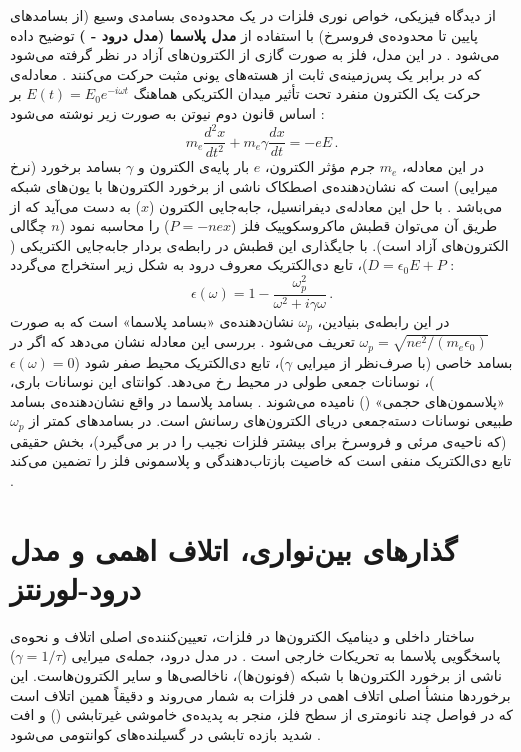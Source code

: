 \documentclass[12pt,a4paper]{report}
\begin{document}
از دیدگاه فیزیکی، خواص نوری فلزات در یک محدوده‌ی بسامدی وسیع (از بسامدهای پایین تا محدوده‌ی فروسرخ) با استفاده از \textbf{مدل پلاسما (مدل درود - )} توضیح داده می‌شود \cite{maier,novotny}. در این مدل، فلز به صورت گازی از الکترون‌های آزاد در نظر گرفته می‌شود که در برابر یک پس‌زمینه‌ی ثابت از هسته‌های یونی مثبت حرکت می‌کنند \cite{maier}. معادله‌ی حرکت یک الکترون منفرد تحت تأثیر میدان الکتریکی هماهنگ $E(t)=E_0e^{-i\omega t}$ بر اساس قانون دوم نیوتن به صورت زیر نوشته می‌شود \cite{maier}:
\begin{equation}
m_e\frac{d^2x}{dt^2}+m_e\gamma\frac{dx}{dt}=-eE\,.
\end{equation}
در این معادله، $m_e$ جرم مؤثر الکترون، $e$ بار پایه‌ی الکترون و $\gamma$ بسامد برخورد (نرخ میرایی) است که نشان‌دهنده‌ی اصطکاک ناشی از برخورد الکترون‌ها با یون‌های شبکه می‌باشد \cite{maier}. با حل این معادله‌ی دیفرانسیل، جابه‌جایی الکترون ($x$) به دست می‌آید که از طریق آن می‌توان قطبش ماکروسکوپیک فلز ($P=-nex$) را محاسبه نمود ($n$ چگالی الکترون‌های آزاد است). با جایگذاری این قطبش در رابطه‌ی بردار جابه‌جایی الکتریکی ($D=\epsilon_0E+P$)، تابع دی‌الکتریک معروف درود به شکل زیر استخراج می‌گردد \cite{maier,novotny}:
\begin{equation}
\epsilon(\omega)=1-\frac{\omega_p^2}{\omega^2+i\gamma\omega}\,.
\end{equation}
در این رابطه‌ی بنیادین، $\omega_p$ نشان‌دهنده‌ی «بسامد پلاسما» است که به صورت $\omega_p=\sqrt{ne^2/(m_e\epsilon_0)}$ تعریف می‌شود \cite{maier}. بررسی این معادله نشان می‌دهد که اگر در بسامد خاصی (با صرف‌نظر از میرایی $\gamma$)، تابع دی‌الکتریک محیط صفر شود ($\epsilon(\omega)=0$)، نوسانات جمعی طولی در محیط رخ می‌دهد. کوانتای این نوسانات باری، «پلاسمون‌های حجمی» () نامیده می‌شوند \cite{maier}. بسامد پلاسما در واقع نشان‌دهنده‌ی بسامد طبیعی نوسانات دسته‌جمعی دریای الکترون‌های رسانش است. در بسامدهای کمتر از $\omega_p$ (که ناحیه‌ی مرئی و فروسرخ برای بیشتر فلزات نجیب را در بر می‌گیرد)، بخش حقیقی تابع دی‌الکتریک منفی است که خاصیت بازتاب‌دهندگی و پلاسمونی فلز را تضمین می‌کند \cite{maier,novotny}.

\section{گذارهای بین‌نواری، اتلاف اهمی و مدل درود-لورنتز}
ساختار داخلی و دینامیک الکترون‌ها در فلزات، تعیین‌کننده‌ی اصلی اتلاف و نحوه‌ی پاسخگویی پلاسما به تحریکات خارجی است \cite{maier}. در مدل درود، جمله‌ی میرایی ($\gamma=1/\tau$) ناشی از برخورد الکترون‌ها با شبکه (فونون‌ها)، ناخالصی‌ها و سایر الکترون‌هاست. این برخوردها منشأ اصلی اتلاف اهمی در فلزات به شمار می‌روند و دقیقاً همین اتلاف است که در فواصل چند نانومتری از سطح فلز، منجر به پدیده‌ی خاموشی غیرتابشی () و افت شدید بازده تابشی در گسیلنده‌های کوانتومی می‌شود \cite{novotny,anger}.
\end{document}
